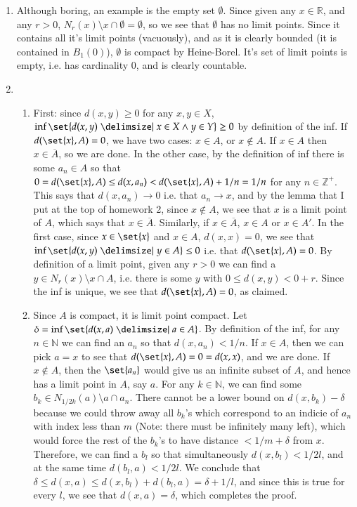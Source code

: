\documentclass[12pt]{article}
\def\mbb#1{\mathbb{#1}}
\def\bN{\mbb{N}}
\def \R{\mbb{R}}
\def\bZ{\mbb{Z}}
\theoremstyle{definition}
\theoremstyle{remark}
\begin{document}
\begin{enumerate}[leftmargin=\labelsep]
		\item Although boring, an example is the empty set $\emptyset$. Since given any $x \in \R$, and any $r > 0$, $N_r(x) \setminus x \cap \emptyset = \emptyset$, so we see that $\emptyset$ has no limit points. Since it contains all it's limit points (vacuously), and as it is clearly bounded (it is contained in $B_1(0)$), $\emptyset$ is compact by Heine-Borel. It's set of limit points is empty, i.e. has cardinality 0, and is clearly countable. 
		
		\item \begin{enumerate}
			\item First: since $d(x, y) \geq 0$ for any $x, y \in X$, $\inf\set{d(x,y) \given x \in X \land y \in Y} \geq 0$ by definition of the inf. If $d(\set{x}, A) = 0$, we have two cases: $x \in A$, or $x \not \in A$. If $x \in A$ then $x \in \overline{A}$, so we are done. In the other case, by the definition of inf there is some $a_n \in A$ so that $0 = d(\set{x}, A) \leq d(x, a_n) < d(\set{x}, A) + 1/n = 1/n$ for any $n \in \bZ^+$. This says that $d(x, a_n) \to 0$ i.e. that $a_n \to x$, and by the lemma that I put at the top of homework 2, since $x \not \in A$, we see that $x$ is a limit point of $A$, which says that $x \in \overline{A}$. Similarly, if $x \in \overline{A}$, $x \in A$ or $x \in A'$. In the first case, since $x \in \set{x}$ and $x \in A$, $d(x, x) = 0$, we see that $\inf\set{d(x, y) \given y \in A} \leq 0$ i.e. that $d(\set{x}, A) = 0$. By definition of a limit point, given any $r > 0$ we can find a $y \in N_r(x) \setminus x \cap A$, i.e. there is some $y$ with $0 \leq d(x, y) < 0 + r$. Since the inf is unique, we see that $d(\set{x}, A) = 0$, as claimed.
			
			\item Since $A$ is compact, it is limit point compact. Let $\delta = \inf\set{d(x, a) \given a \in A}$. By definition of the inf, for any $n \in \bN$ we can find an $a_n$ so that $d(x, a_n) < 1/n$. If $x \in A$, then we can pick $a = x$ to see that $d(\set{x}, A) = 0 = d(x, x)$, and we are done. If $x \not \in A$, then the $\set{a_n}$ would give us an infinite subset of $A$, and hence has a limit point in $A$, say $a$. For any $k \in \bN$, we can find some $b_k \in N_{1/2k}(a) \setminus a \cap {a_n}$. There cannot be a lower bound on $d(x, b_k) - \delta$ because we could throw away all $b_k$'s which correspond to an indicie of $a_n$ with index less than $m$ (Note: there must be infinitely many left), which would force the rest of the $b_k$'s to have distance $< 1/m + \delta$ from $x$. Therefore, we can find a $b_l$ so that simultaneously $d(x, b_l) < 1/2l$, and at the same time $d(b_l, a) < 1/2l$. We conclude that $\delta \leq d(x, a) \leq d(x, b_l) + d(b_l, a) = \delta + 1/l$, and since this is true for every $l$, we see that $d(x, a) = \delta$, which completes the proof.
			

\end{enumerate}
\end{enumerate}
\end{document}
